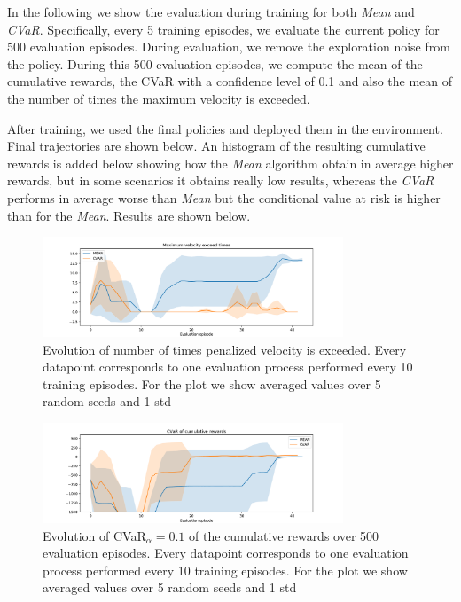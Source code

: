 In the following we show the evaluation during training for both \textit{Mean} and
\textit{CVaR}.
Specifically, every 5 training episodes, we evaluate the current policy for 500 evaluation
episodes.
During evaluation, we remove the exploration noise from the policy.
During this 500 evaluation episodes, we compute the mean of the cumulative rewards,
the CVaR with a confidence level of 0.1 and also the mean of the number of times the 
maximum velocity is exceeded. 

After training, we used the final policies and deployed them in the 
environment. Final trajectories are shown below.
An histogram of the resulting cumulative rewards is added below showing
how the \textit{Mean} algorithm obtain in average higher rewards, but in some scenarios it 
obtains really low results, whereas the \textit{CVaR} performs in average worse than \textit{Mean} 
but the conditional value at risk is higher than for the \textit{Mean}.
Results are shown below.

\begin{figure}[ht]
        \centering
        \includegraphics[width=0.8\textwidth]{images/Car/CVAR/times_exceedvel_withstds.pdf}
        \caption{Evolution of number of times penalized velocity is exceeded.
        Every datapoint corresponds
        to one evaluation process performed every 10 training episodes. For the plot we
        show averaged values over 5 random seeds and 1 std}
        \label{fig:maxveltimes_car}
    
\end{figure}

\begin{figure}[ht]
        \centering
        \includegraphics[width=0.8\textwidth]{images/Car/CVAR/cvar_train_withstds.pdf}
        \caption{Evolution of CVaR$_\alpha=0.1$ of the cumulative rewards over 500 evaluation episodes.
        Every datapoint corresponds
        to one evaluation process performed every 10 training episodes.
        For the plot we
        show averaged values over 5 random seeds and 1 std}
        \label{fig:cvar_car}
    
\end{figure}

